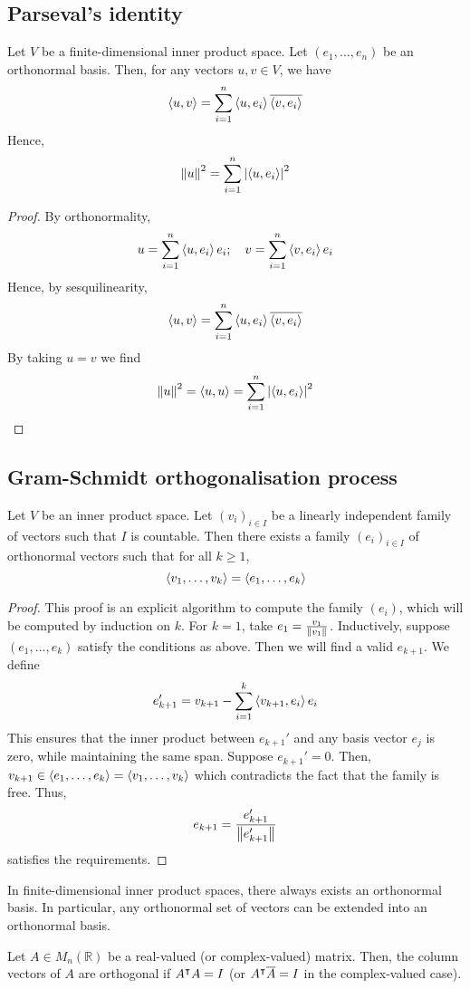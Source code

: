 \subsection{Parseval's identity}
\begin{corollary}
	Let \( V \) be a finite-dimensional inner product space.
	Let \( (e_1, \dots, e_n) \) be an orthonormal basis.
	Then, for any vectors \( u, v \in V \), we have
	\[
		\left\langle{u, v}\right\rangle = \sum_{i=1}^n \left\langle{u, e_i}\right\rangle \overline{\left\langle{v, e_i}\right\rangle}
	\]
	Hence,
	\[
		\norm{u}^2 = \sum_{i=1}^n \abs{\left\langle{u,e_i}\right\rangle}^2
	\]
\end{corollary}
\begin{proof}
	By orthonormality,
	\[
		u = \sum_{i=1}^n \left\langle{u, e_i}\right\rangle e_i;\quad v = \sum_{i=1}^n \left\langle{v, e_i}\right\rangle e_i
	\]
	Hence, by sesquilinearity,
	\[
		\left\langle{u,v}\right\rangle = \sum_{i=1}^n \left\langle{u, e_i}\right\rangle \overline{\left\langle{v, e_i}\right\rangle}
	\]
	By taking \( u = v \) we find
	\[
		\norm{u}^2 = \left\langle{u,u}\right\rangle = \sum_{i=1}^n \abs{\left\langle{u,e_i}\right\rangle}^2
	\]
\end{proof}

\subsection{Gram-Schmidt orthogonalisation process}
\begin{theorem}
	Let \( V \) be an inner product space.
	Let \( (v_i)_{i \in I} \) be a linearly independent family of vectors such that \( I \) is countable.
	Then there exists a family \( (e_i)_{i \in I} \) of orthonormal vectors such that for all \( k \geq 1 \),
	\[
		\left\langle{} v_1, \dots, v_k \right\rangle = \left\langle{} e_1, \dots, e_k \right\rangle
	\]
\end{theorem}
\begin{proof}
	This proof is an explicit algorithm to compute the family \( (e_i) \), which will be computed by induction on \( k \).
	For \( k = 1 \), take \( e_1 = \frac{v_1}{\norm{v_1}} \).
	Inductively, suppose \( (e_1, \dots, e_k) \) satisfy the conditions as above.
	Then we will find a valid \( e_{k+1} \).
	We define
	\[
		e_{k+1}' = v_{k+1} - \sum_{i=1}^k \left\langle{v_{k+1}, e_i}\right\rangle e_i
	\]
	This ensures that the inner product between \( e_{k+1}' \) and any basis vector \( e_j \) is zero, while maintaining the same span.
	Suppose \( e_{k+1}' = 0 \).
	Then, \( v_{k+1} \in \left\langle{} e_1, \dots, e_k \right\rangle = \left\langle{} v_1, \dots, v_k \right\rangle \) which contradicts the fact that the family is free.
	Thus,
	\[
		e_{k+1} = \frac{e_{k+1}'}{\norm{e_{k+1}'}}
	\]
	satisfies the requirements.
\end{proof}
\begin{corollary}
	In finite-dimensional inner product spaces, there always exists an orthonormal basis.
	In particular, any orthonormal set of vectors can be extended into an orthonormal basis.
\end{corollary}
\begin{remark}
	Let \( A \in M_n(\mathbb R) \) be a real-valued (or complex-valued) matrix.
	Then, the column vectors of \( A \) are orthogonal if \( A^\intercal A = I \) (or \( A^\intercal \overline A = I \) in the complex-valued case).
\end{remark}

